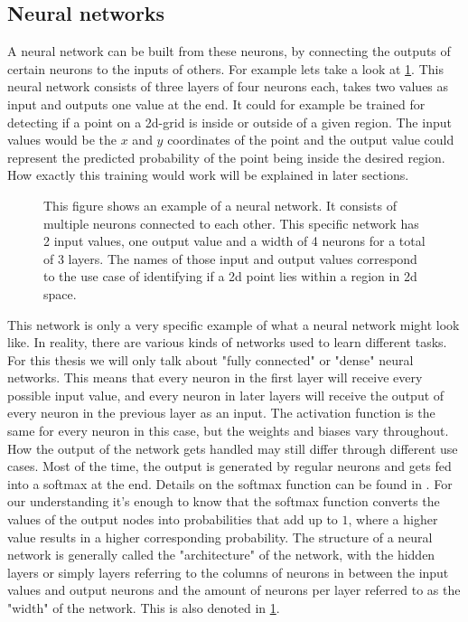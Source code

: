 \subsection{Neural networks}\label{sec:NeuralNetworks}
A neural network can be built from these neurons, by connecting the outputs of certain neurons to the inputs of others. For example lets take a look at \cref{fig:Neural_network_example}. This neural network consists of three layers of four neurons each, takes two values as input and outputs one value at the end. It could for example be trained for detecting if a point on a 2d-grid is inside or outside of a given region. The input values would be the $x$ and $y$ coordinates of the point and the output value could represent the predicted probability of the point being inside the desired region. How exactly this training would work will be explained in later sections. \\
\begin{figure}
	\centering
	
	\caption{This figure shows an example of a neural network. It consists of multiple neurons connected to each other. This specific network has 2 input values, one output value and a width of 4 neurons for a total of 3 layers. The names of those input and output values correspond to the use case of identifying if a 2d point lies within a region in 2d space.}
	\label{fig:Neural_network_example}
\end{figure}
This network is only a very specific example of what a neural network might look like. In reality, there are various kinds of networks used to learn different tasks. For this thesis we will only talk about "fully connected" or "dense" neural networks. This means that every neuron in the first layer will receive every possible input value, and every neuron in later layers will receive the output of every neuron in the previous layer as an input. The activation function is the same for every neuron in this case, but the weights and biases vary throughout. How the output of the network gets handled may still differ through different use cases. Most of the time, the output is generated by regular neurons and gets fed into a softmax at the end. Details on the softmax function can be found in \cite{gao2018properties}. For our understanding it's enough to know that the softmax function converts the values of the output nodes into probabilities that add up to $1$, where a higher value results in a higher corresponding probability. The structure of a neural network is generally called the "architecture" of the network, with the hidden layers or simply layers referring to the columns of neurons in between the input values and output neurons and the amount of neurons per layer referred to as the "width" of the network. This is also denoted in \cref{fig:Neural_network_example}. 
